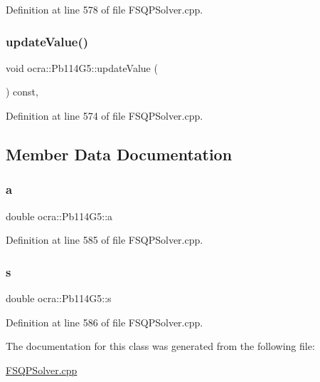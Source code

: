 Definition at line 578 of file F\+S\+Q\+P\+Solver.\+cpp.

\hypertarget{classocra_1_1Pb114G5_a2a19291b7ef222254a018c0e25df8f57}{}\label{classocra_1_1Pb114G5_a2a19291b7ef222254a018c0e25df8f57} 
\subsubsection{\texorpdfstring{update\+Value()}{updateValue()}}
{\footnotesize\ttfamily void ocra\+::\+Pb114\+G5\+::update\+Value (\begin{DoxyParamCaption}{ }\end{DoxyParamCaption}) const\hspace{0.3cm}{\ttfamily [inline]}, {\ttfamily [protected]}}



Definition at line 574 of file F\+S\+Q\+P\+Solver.\+cpp.



\subsection{Member Data Documentation}
\hypertarget{classocra_1_1Pb114G5_a36c7950fd1d7556715ae7e0749e88211}{}\label{classocra_1_1Pb114G5_a36c7950fd1d7556715ae7e0749e88211} 
\subsubsection{\texorpdfstring{a}{a}}
{\footnotesize\ttfamily double ocra\+::\+Pb114\+G5\+::a\hspace{0.3cm}{\ttfamily [protected]}}



Definition at line 585 of file F\+S\+Q\+P\+Solver.\+cpp.

\hypertarget{classocra_1_1Pb114G5_a97daa687d5cec8995656fa8787f8a89e}{}\label{classocra_1_1Pb114G5_a97daa687d5cec8995656fa8787f8a89e} 
\subsubsection{\texorpdfstring{s}{s}}
{\footnotesize\ttfamily double ocra\+::\+Pb114\+G5\+::s\hspace{0.3cm}{\ttfamily [protected]}}



Definition at line 586 of file F\+S\+Q\+P\+Solver.\+cpp.



The documentation for this class was generated from the following file\+:\begin{DoxyCompactItemize}
\item 
\hyperlink{FSQPSolver_8cpp}{F\+S\+Q\+P\+Solver.\+cpp}\end{DoxyCompactItemize}
